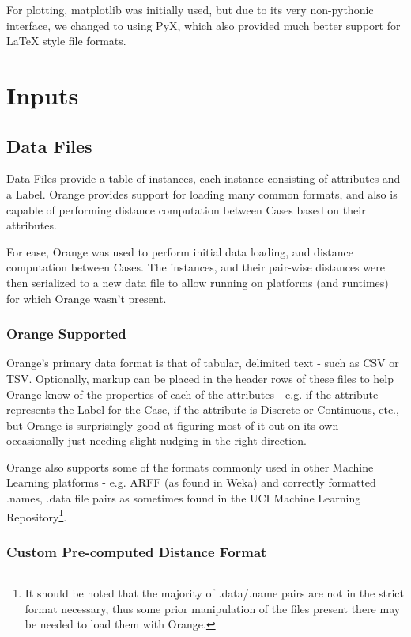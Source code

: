 \documentclass[a4paper,11pt]{report}
\begin{document}
For plotting, matplotlib\cite{prog:matplotlib} was initially used, but due to its very non-pythonic interface, we changed to using PyX\cite{prog:pyx}, which also provided much better support for LaTeX style file formats.

\section{Inputs}
\subsection{Data Files}
Data Files provide a table of instances, each instance consisting of attributes and a Label. Orange provides support for loading many common formats, and also is capable of performing distance computation between Cases based on their attributes.

For ease, Orange was used to perform initial data loading, and distance computation between Cases. The instances, and their pair-wise distances were then serialized to a new data file to allow running on platforms (and runtimes) for which Orange wasn't present.

\subsubsection{Orange Supported}
Orange's primary data format is that of tabular, delimited text - such as CSV or TSV. Optionally, markup can be placed in the header rows of these files to help Orange know of the properties of each of the attributes - e.g. if the attribute represents the Label for the Case, if the attribute is Discrete or Continuous, etc., but Orange is surprisingly good at figuring most of it out on its own - occasionally just needing slight nudging in the right direction.

Orange also supports some of the formats commonly used in other Machine Learning platforms - e.g. ARFF (as found in Weka) and correctly formatted .names, .data file pairs as sometimes found in the UCI Machine Learning Repository\cite{web:uci}\footnote{It should be noted that the majority of .data/.name pairs are not in the strict format necessary, thus some prior manipulation of the files present there may be needed to load them with Orange.}.

\subsubsection{Custom Pre-computed Distance Format}
\end{document}
